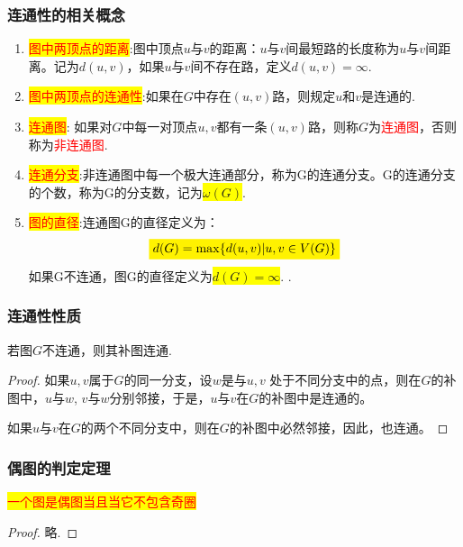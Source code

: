 \subsubsection{连通性的相关概念}

\begin{enumerate}
	\item \colorbox{yellow}{\textcolor{red}{图中两顶点的距离}}:图中顶点$u$与$v$的距离：$u$与$v$间最短路的长度称为$u$与$v$间距离。记为$d(u, v)$，如果$u$与$v$间不存在路，定义$d(u, v)=\infty$.
	\item \colorbox{yellow}{\textcolor{red}{图中两顶点的连通性}}:如果在$G$中存在$(u,v)$路，则规定$u$和$v$是连通的.
	\item  \colorbox{yellow}{\textcolor{red}{连通图}}: 如果对$G$中每一对顶点$u,v$都有一条$(u,v)$路，则称$G$为\textcolor{red}{连通图}，否则称为\textcolor{red}{非连通图}.
	
	\item  \colorbox{yellow}{\textcolor{red}{连通分支}}:非连通图中每一个极大连通部分，称为G的连通分支。G的连通分支的个数，称为G的分支数，记为\colorbox{yellow}{$\omega(G)$}.
	
	\item  \colorbox{yellow}{\textcolor{red}{图的直径}}:连通图G的直径定义为：
	\[
	\colorbox{yellow}{$d(G) = \mathrm{max}\{d(u,v) |u,v \in V(G)\}$}
	\]
	如果G不连通，图G的直径定义为\colorbox{yellow}{$d(G) = \infty$}.
	.
\end{enumerate}

\subsubsection{连通性性质}

\begin{theorem}
	若图$G$不连通，则其补图连通.
\end{theorem}
\begin{proof}
如果$u, v$属于$G$的同一分支，设$w$是与$u, v$ 处于不同分支中的点，则在$G$的补图中，$u$与$w$, $v$与$w$分别邻接，于是，$u$与$v$在$G$的补图中是连通的。
	
如果$u$与$v$在$G$的两个不同分支中，则在$G$的补图中必然邻接，因此，也连通。
\end{proof}


\subsubsection{偶图的判定定理}
\begin{theorem}
	\colorbox{yellow}{\textcolor{red}{一个图是偶图当且当它不包含奇圈}}
\end{theorem}
\begin{proof}
	略.
\end{proof}

